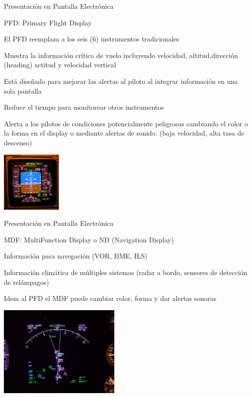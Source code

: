 \documentclass[10pt]{beamer}
\begin{document}
\begin{frame}{Presentaci\'on en Pantalla Electr\'onica}

     \begin{block}{ PFD: Primary Flight Display}
{\footnotesize
	
	

	El PFD reemplaza a los seis (6) instrumentos tradicionales

	Muestra la informaci\'on cr\'itica de vuelo 
	incluyendo velocidad, altitud,direcci\'on (heading)
	actitud y velocidad vertical

	Est\'a dise\~nado para mejorar las alertas al piloto
	al integrar informaci\'on en una sola pantalla

	Reduce el tiempo para monitorear otros instrumentos

	Alerta a los pilotos de condiciones potencialmente peligrosas
        cambiando el color o la forma en el display o mediante alertas
        de sonido. (baja velocidad, alta tasa de descenso) 
}
    \end{block}

 \includegraphics[width=3cm]{imagenes/1.4.pantalla.electronica/Primary_Flight_Display,_Boeing_747-400.png}\\
 

    \end{frame}      
    
\begin{frame}{Presentaci\'on en Pantalla Electr\'onica}

  \begin{block}{ MDF: MultiFunction Display o ND (Navigation Display)}

    Informaci\'on para navegaci\'on (VOR, DME, ILS)

    Informaci\'on clim\'atica de m\'ultiples sistemas (radar a bordo,
    sensores de detecci\'on de rel\'ampagos)

    Idem al PFD el MDF puede cambiar color, forma y dar alertas
    sonoras

    \includegraphics[width=6cm]{imagenes/1.4.pantalla.electronica/Navigation_Display_(ND)_on_Boeing_747-400.jpg}
  \end{block}
    \end{frame}      
    
\end{document}
